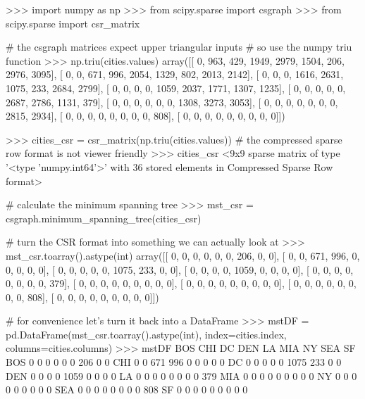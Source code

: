 \begin{python}
>>> import numpy as np
>>> from scipy.sparse import csgraph
>>> from scipy.sparse import csr_matrix

# the csgraph matrices expect upper triangular inputs
# so use the numpy triu function
>>> np.triu(cities.values)
array([[   0,  963,  429, 1949, 2979, 1504,  206, 2976, 3095],
       [   0,    0,  671,  996, 2054, 1329,  802, 2013, 2142],
       [   0,    0,    0, 1616, 2631, 1075,  233, 2684, 2799],
       [   0,    0,    0,    0, 1059, 2037, 1771, 1307, 1235],
       [   0,    0,    0,    0,    0, 2687, 2786, 1131,  379],
       [   0,    0,    0,    0,    0,    0, 1308, 3273, 3053],
       [   0,    0,    0,    0,    0,    0,    0, 2815, 2934],
       [   0,    0,    0,    0,    0,    0,    0,    0,  808],
       [   0,    0,    0,    0,    0,    0,    0,    0,    0]])

>>> cities_csr = csr_matrix(np.triu(cities.values))
# the compressed sparse row format is not viewer friendly
>>> cities_csr
<9x9 sparse matrix of type '<type 'numpy.int64'>'
	with 36 stored elements in Compressed Sparse Row format>

# calculate the minimum spanning tree
>>> mst_csr = csgraph.minimum_spanning_tree(cities_csr)

# turn the CSR format into something we can actually look at
>>> mst_csr.toarray().astype(int)
array([[   0,    0,    0,    0,    0,    0,  206,    0,    0],
       [   0,    0,  671,  996,    0,    0,    0,    0,    0],
       [   0,    0,    0,    0,    0, 1075,  233,    0,    0],
       [   0,    0,    0,    0, 1059,    0,    0,    0,    0],
       [   0,    0,    0,    0,    0,    0,    0,    0,  379],
       [   0,    0,    0,    0,    0,    0,    0,    0,    0],
       [   0,    0,    0,    0,    0,    0,    0,    0,    0],
       [   0,    0,    0,    0,    0,    0,    0,    0,  808],
       [   0,    0,    0,    0,    0,    0,    0,    0,    0]])

# for convenience let's turn it back into a DataFrame
>>> mstDF = pd.DataFrame(mst_csr.toarray().astype(int), index=cities.index, columns=cities.columns)
>>> mstDF
     BOS  CHI   DC  DEN    LA   MIA   NY  SEA   SF
BOS    0    0    0    0     0     0  206    0    0
CHI    0    0  671  996     0     0    0    0    0
DC     0    0    0    0     0  1075  233    0    0
DEN    0    0    0    0  1059     0    0    0    0
LA     0    0    0    0     0     0    0    0  379
MIA    0    0    0    0     0     0    0    0    0
NY     0    0    0    0     0     0    0    0    0
SEA    0    0    0    0     0     0    0    0  808
SF     0    0    0    0     0     0    0    0    0
\end{python}

